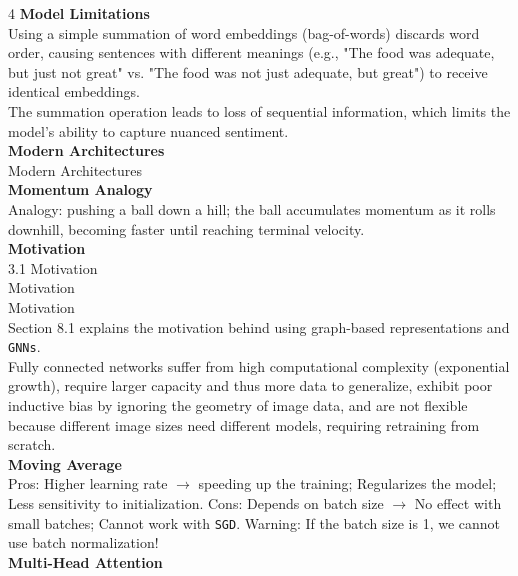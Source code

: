\documentclass[8pt]{extarticle}
\begin{document}
\begin{multicols}{4}
\vspace{2pt}\textbf{Model Limitations}\\
Using a simple summation of word embeddings (bag-of-words) discards word order, causing sentences with different meanings (e.g., "The food was adequate, but just not great" vs. "The food was not just adequate, but great") to receive identical embeddings.\\
The summation operation leads to loss of sequential information, which limits the model's ability to capture nuanced sentiment.\\
\vspace{2pt}\textbf{Modern Architectures}\\
Modern Architectures\\
\vspace{2pt}\textbf{Momentum Analogy}\\
Analogy: pushing a ball down a hill; the ball accumulates momentum as it rolls downhill, becoming faster until reaching terminal velocity.\\
\vspace{2pt}\textbf{Motivation}\\
3.1 Motivation\\
Motivation\\
Motivation\\
Section 8.1 explains the motivation behind using graph-based representations and \texttt{GNNs}.\\
Fully connected networks suffer from high computational complexity (exponential growth), require larger capacity and thus more data to generalize, exhibit poor inductive bias by ignoring the geometry of image data, and are not flexible because different image sizes need different models, requiring retraining from scratch.\\
\vspace{2pt}\textbf{Moving Average}\\
Pros: Higher learning rate $\rightarrow$ speeding up the training; Regularizes the model; Less sensitivity to initialization. Cons: Depends on batch size $\rightarrow$ No effect with small batches; Cannot work with \texttt{SGD}. Warning: If the batch size is 1, we cannot use batch normalization!\\
\vspace{2pt}\textbf{Multi-Head Attention}\\


\end{multicols}
\end{document}
